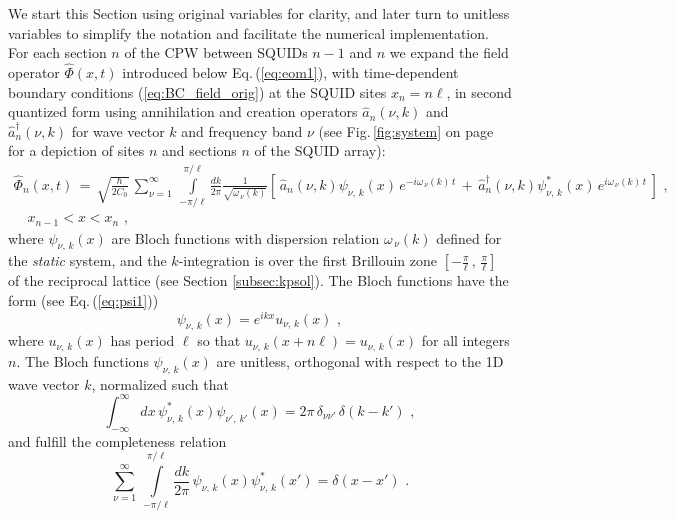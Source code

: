 \noindent
We start this Section using original variables for clarity, and later turn to unitless variables to 
simplify the notation and facilitate the numerical implementation. 
For each section $n$ of the CPW between SQUIDs $n-1$ and $n$ we expand the field operator $\hat{\Phi}(x,t)$
introduced below Eq.\,(\ref{eq:eom1}), with time-dependent 
boundary conditions (\ref{eq:BC_field_orig}) at the SQUID sites 
$x_n = n \ell$, in second quantized form using annihilation and creation operators $\hat{a}_n(\nu,k)$ and 
${\hat a}_n^\dagger(\nu,k)$ for wave vector $k$ and frequency band $\nu$
(see Fig.\,\ref{fig:system} on page \pageref{fig:system} for a depiction of 
sites $n$ and sections $n$ of the SQUID array):  
%
\begin{equation} \label{eq:flux_field_orig}
\begin{split}
    \hat{\Phi}_n(x,t) \, = \, \sqrt{\frac{\hbar}{2 C_0}} \, \sum_{\nu=1}^{\infty} \, 
    \int\limits_{-\pi/\ell}^{\pi/\ell}\frac{dk}{2 \pi} \frac{1}{\sqrt{\omega_{\,\nu}(k)}}
    \left[ \, \hat{a}_n(\nu,k) \psi_{\nu,\,k}(x) \, e^{-i \omega_{\,\nu}(k) \, t} \, + \, 
    \hat{a}_n^{\dagger}(\nu,k) \psi_{\nu,\,k}^*(x) \, e^{i \omega_{\,\nu}(k) \, t} \, \right] \, \, , \\
    \quad x_{n-1} < x < x_n \, \, ,
\end{split}
\end{equation}
%
where $\psi_{\nu,\,k}(x)$ are Bloch functions with dispersion relation $\omega_{\,\nu}(k)$ defined for 
the {\em static} system, 
\color{red} and the $k$-integration is over the first Brillouin zone 
$\displaystyle{\left[-\frac{\pi}{\ell}\, , \, \frac{\pi}{\ell} \right]}$
of the reciprocal lattice
\color{black}
(see Section \ref{subsec:kpsol}). The Bloch functions have the form (see Eq.\,(\ref{eq:psi1})) 
%
\begin{equation} \label{eq:psi2}
\psi_{\nu,\,k}(x) = e^{i k x} u_{\nu,\,k}(x) \, \, ,
\end{equation}
%
where $u_{\nu,\,k}(x)$ has period $\ell$ so that $u_{\nu,\,k}(x + n \ell) = u_{\nu,\,k}(x)$
for all integers $n$.
The Bloch functions $\psi_{\nu,\,k}(x)$ are unitless, orthogonal with respect to 
the 1D wave vector $k$, normalized such that
%
\begin{equation} \label{eq:psi1_norm_orig2}
\int_{-\infty}^{\infty} dx \, \psi^*_{\nu,\,k}(x) \psi_{\nu',\,k'}(x) = 2 \pi \, \delta_{\nu \nu'} \, \delta(k - k') \, \, ,
\end{equation}
%
and fulfill the completeness relation
%
\begin{equation} \label{eq:psi1_comp_orig}
\sum_{\nu=1}^{\infty} \, 
\int\limits_{-\pi/\ell}^{\pi/\ell}\frac{dk}{2 \pi} \, 
\psi_{\nu,\,k}(x) \psi^*_{\nu,\,k}(x') = \delta(x-x') \, \, .
\end{equation}
